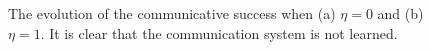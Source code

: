 \begin{figure}[H]
	\centering
	\caption{The evolution of the communicative success when (a) $\eta=0$ and (b) $\eta=1$. It is clear that the communication system is not learned.}
	\label{f:lex:csA0}
\end{figure} 

